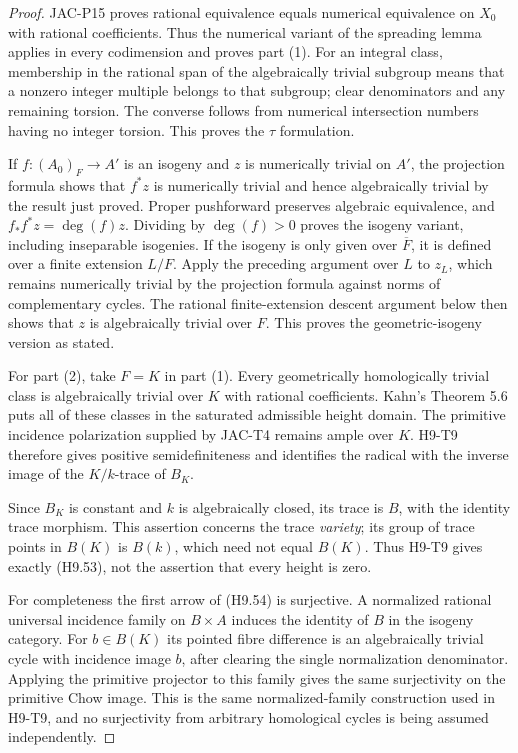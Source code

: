 \documentclass[11pt,a4paper]{article}
\begin{document}
\begin{proof}
JAC-P15 proves rational equivalence equals numerical equivalence on
$X_0$ with rational coefficients. Thus the numerical variant of the
spreading lemma applies in every codimension and proves part (1).
For an integral class, membership in the rational span of the
algebraically trivial subgroup means that a nonzero integer multiple
belongs to that subgroup; clear denominators and any remaining
torsion. The converse follows from numerical intersection numbers
having no integer torsion. This proves the $\tau$ formulation.

If $f:(A_0)_F\to A'$ is an isogeny and $z$ is numerically trivial
on $A'$, the projection formula shows that $f^*z$ is numerically
trivial and hence algebraically trivial by the result just proved.
Proper pushforward preserves algebraic
equivalence, and $f_*f^*z=\deg(f)z$. Dividing by $\deg(f)>0$
proves the isogeny variant, including inseparable isogenies.
If the isogeny is only given over $\overline F$, it is defined
over a finite extension $L/F$. Apply the preceding argument over
$L$ to $z_L$, which remains numerically trivial by the projection
formula against norms of complementary cycles. The rational
finite-extension descent argument below then shows that $z$ is
algebraically trivial over $F$. This proves the geometric-isogeny
version as stated.

For part (2), take $F=K$ in part (1). Every geometrically
homologically trivial class is algebraically trivial over $K$ with
rational coefficients. Kahn's Theorem 5.6 puts all of these classes
in the saturated admissible height domain. The primitive incidence
polarization supplied by JAC-T4 remains ample over $K$.
H9-T9 therefore gives positive semidefiniteness and identifies the
radical with the inverse image of the $K/k$-trace of $B_K$.

Since $B_K$ is constant and $k$ is algebraically closed, its trace is
$B$, with the identity trace morphism. This assertion concerns the
trace \emph{variety}; its group of trace points in $B(K)$ is
$B(k)$, which need not equal $B(K)$. Thus H9-T9 gives exactly
(H9.53), not the assertion that every height is zero.

For completeness the first arrow of (H9.54) is surjective.
A normalized rational universal incidence family on $B\times A$
induces the identity of $B$ in the isogeny category. For $b\in B(K)$
its pointed fibre difference is an algebraically trivial cycle with
incidence image $b$, after clearing the single normalization
denominator. Applying the primitive projector to this family gives
the same surjectivity on the primitive Chow image. This is the same
normalized-family construction used in H9-T9, and no surjectivity
from arbitrary homological cycles is being assumed independently.


\end{proof}
\end{document}
